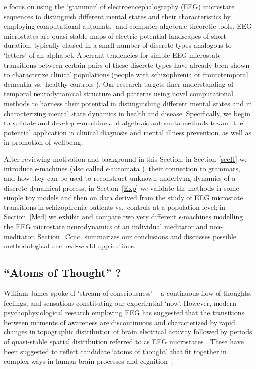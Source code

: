 \documentclass[journal]{IEEEtran}
\begin{document}
e  focus on using the `grammar' of  electroencephalography (EEG) microstate sequences to distinguish different mental states and their characteristics by employing computational automata- and computer algebraic theoretic tools. 
EEG microstates are quasi-stable maps of electric potential landscapes of short duration, typically classed in a small number of discrete types analogous    to `letters' of an alphabet.  Aberrant tendencies for simple EEG microstate transitions between certain pairs of these discrete types have already been shown to characterize clinical populations (people with schizophrenia or frontotemporal dementia vs.\ healthy controls \cite{Lehmann2005,Nishida2013}). Our research targets finer understanding of temporal neurodynamical structure and patterns using novel computational methods to harness their potential in distinguishing different mental states and in characterizing mental state dynamics in health and disease. 
Specifically, we begin to validate and develop $\epsilon$-machine and algebraic automata methods toward their potential application in clinical diagnosis and mental illness prevention, as well as in promotion of wellbeing.

After reviewing motivation and background in this Section, in Section~\ref{secII} we introduce $\epsilon$-machines (also called $\epsilon$-automata \cite{CrutchfieldYoung1989,Crutchfield1993}), their connection to grammars, and how they can be used to reconstruct unknown underlying dynamics of a discrete dynamical process; in Section~\ref{Exp} we validate the methods in some simple toy models and then on data derived from the study of EEG microstate transitions in schizophrenia patients vs.~controls at a population level; in Section~\ref{Med} we exhibit and compare two  very different $\epsilon$-machines modelling the EEG microstate neurodynamics of an individual meditator and   non-meditator.  Section~\ref{Conc} summarizes our conclusions and discusses possible methodological and real-world applications.

\subsection{``Atoms of Thought'' ?}
William James \cite{James} spoke of `stream of consciousness' -- a continuous flow of thoughts, feelings, and
sensations constituting our experiential `now'. However, modern psychophysiological research employing EEG
has suggested that the transitions between moments of awareness are discontinuous and characterized by
rapid changes in topographic distribution of brain electrical activity followed by periods of quasi-stable spatial distribution referred to as
EEG microstates \cite{Lehmann1998}.  These have been suggested to reflect candidate  `atoms of thought'  that fit together in complex ways in human brain processes and cognition~\cite{Lehmann1998}.
\end{document}
